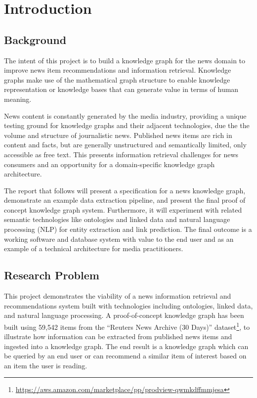 \documentclass[11pt]{article}
\begin{document}
\newpage
\tableofcontents

\newpage
\listoftables
\listoffigures

\newpage
\section{Introduction}

\subsection{Background}
The intent of this project is to build a knowledge graph for the news domain to improve news item recommendations and information retrieval. Knowledge graphs make use of the mathematical graph structure to enable knowledge representation or knowledge bases that can generate value in terms of human meaning.

News content is constantly generated by the media industry, providing a unique testing ground for knowledge graphs and their adjacent technologies, due the the volume and structure of journalistic news. Published news items are rich in content and facts, but are generally unstructured and semantically limited, only accessible as free text. This presents information retrieval challenges for news consumers and an opportunity for a domain-specific knowledge graph architecture.

The report that follows will present a specification for a news knowledge graph, demonstrate an example data extraction pipeline, and present the final proof of concept knowledge graph system. Furthermore, it will experiment with related semantic technologies like ontologies and linked data and natural language processing (NLP) for entity extraction and link prediction. The final outcome is a working software and database system with value to the end user and as an example of a technical architecture for media practitioners.

\subsection{Research Problem}

This project demonstrates the viability of a news information retrieval and recommendations system built with technologies including ontologies, linked data, and natural language processing. A proof-of-concept knowledge graph has been built using 59,542 items from the ``Reuters News Archive (30 Days)'' dataset\footnote{\url{https://aws.amazon.com/marketplace/pp/prodview-qwmkdffmmjesa}}, to illustrate how information can be extracted from published news items and ingested into a knowledge graph. The end result is a knowledge graph which can be queried by an end user or can recommend a similar item of interest based on an item the user is reading.
\end{document}
